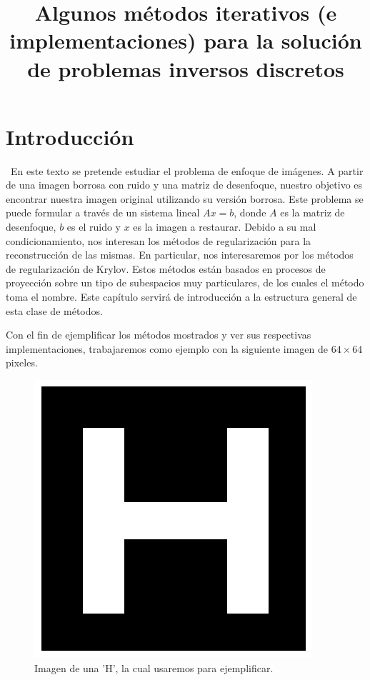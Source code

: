 \documentclass[12pt, oneside]{book}
\title{Algunos métodos iterativos (e implementaciones) para la solución de problemas inversos discretos}
\author{}
\date{}
\begin{document}
	\maketitle
	\tableofcontents
	
	
	\chapter{Introducción}
	\ En este texto se pretende estudiar el problema de enfoque de imágenes. A partir de una imagen borrosa con ruido y una matriz de desenfoque, nuestro objetivo es encontrar nuestra imagen original utilizando su versión borrosa. Este problema se puede formular a través de un sistema lineal $Ax = b$, donde $A$ es la matriz de desenfoque, $b$ es el ruido y $x$ es la imagen a restaurar. Debido a su mal condicionamiento, nos interesan los métodos de regularización para la reconstrucción de las mismas. En particular, nos interesaremos por los métodos de regularización de Krylov. Estos métodos están basados en procesos de proyección sobre un tipo de subespacios muy particulares, de los cuales el método toma el nombre. Este capítulo servirá de introducción a la estructura general de esta clase de métodos.
	
	Con el fin de ejemplificar los métodos mostrados y ver sus respectivas implementaciones, trabajaremos como ejemplo con la siguiente imagen de $64\times 64$ pixeles.
	
	\begin{figure}[H]
		\centering
		\includegraphics[scale=0.5]{Imagenes/H.png}
		\caption{Imagen de una 'H', la cual usaremos para ejemplificar.\\}
	\end{figure}
	
\end{document}
